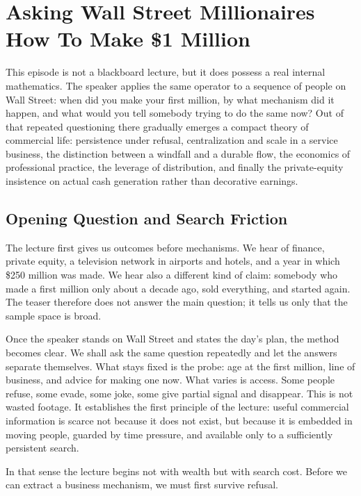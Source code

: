 \chapter{Asking Wall Street Millionaires How To Make \$1 Million}

This episode is not a blackboard lecture, but it does possess a real internal mathematics. The speaker applies the same operator to a sequence of people on Wall Street: when did you make your first million, by what mechanism did it happen, and what would you tell somebody trying to do the same now? Out of that repeated questioning there gradually emerges a compact theory of commercial life: persistence under refusal, centralization and scale in a service business, the distinction between a windfall and a durable flow, the economics of professional practice, the leverage of distribution, and finally the private-equity insistence on actual cash generation rather than decorative earnings.

\section{Opening Question and Search Friction}

The lecture first gives us outcomes before mechanisms. We hear of finance, private equity, a television network in airports and hotels, and a year in which \$250 million was made. We hear also a different kind of claim: somebody who made a first million only about a decade ago, sold everything, and started again. The teaser therefore does not answer the main question; it tells us only that the sample space is broad.

Once the speaker stands on Wall Street and states the day's plan, the method becomes clear. We shall ask the same question repeatedly and let the answers separate themselves. What stays fixed is the probe: age at the first million, line of business, and advice for making one now. What varies is access. Some people refuse, some evade, some joke, some give partial signal and disappear. This is not wasted footage. It establishes the first principle of the lecture: useful commercial information is scarce not because it does not exist, but because it is embedded in moving people, guarded by time pressure, and available only to a sufficiently persistent search.

In that sense the lecture begins not with wealth but with search cost. Before we can extract a business mechanism, we must first survive refusal.

